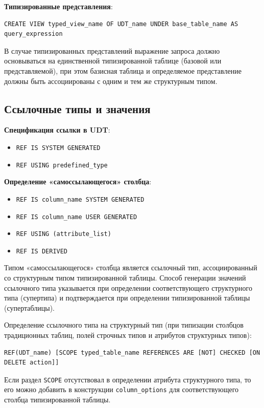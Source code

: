 \documentclass[a4paper,12pt]{article}
\begin{document}
\textbf{Типизированные представления}:

\begin{verbatim}
CREATE VIEW typed_view_name OF UDT_name UNDER base_table_name AS query_expression
\end{verbatim}

В случае типизированных представлений выражение запроса должно основываться на единственной типизированной таблице (базовой или представляемой), при этом базисная таблица и определяемое представление должны быть ассоциированы с одним и тем же структурным типом.

\subsection{Ссылочные типы и значения}

\textbf{Спецификация ссылки в UDT}:
\begin{itemize}
    \item \texttt{REF IS SYSTEM GENERATED}
    \item \texttt{REF USING predefined\_type}
\end{itemize}

\textbf{Определение «самоссылающегося» столбца}:
\begin{itemize}
    \item \texttt{REF IS column\_name SYSTEM GENERATED}
    \item \texttt{REF IS column\_name USER GENERATED}
    \item \texttt{REF USING (attribute\_list)}
    \item \texttt{REF IS DERIVED}
\end{itemize}

Типом «самоссылающегося» столбца является ссылочный тип, ассоциированный со структурным типом типизированной таблицы. Способ генерации значений ссылочного типа указывается при определении соответствующего структурного типа (супертипа) и подтверждается при определении типизированной таблицы (супертаблицы).

Определение ссылочного типа на структурный тип (при типизации столбцов традиционных таблиц, полей строчных типов и атрибутов структурных типов):

\begin{verbatim}
REF(UDT_name) [SCOPE typed_table_name REFERENCES ARE [NOT] CHECKED [ON DELETE action]]
\end{verbatim}

Если раздел \texttt{SCOPE} отсутствовал в определении атрибута структурного типа, то его можно добавить в конструкции \texttt{column\_options} для соответствующего столбца типизированной таблицы.
\end{document}
